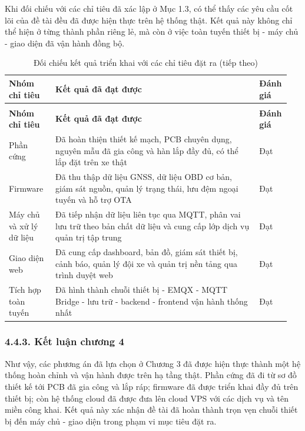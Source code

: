 \documentclass[a4paper]{extarticle}
\newcommand{\thesissettableid}[2]{%
  \renewcommand{\thetable}{#1}%
  \renewcommand{\theHtable}{#2}%
}
\begin{document}
Khi đối chiếu với các chỉ tiêu đã xác lập ở Mục 1.3, có thể thấy các yêu cầu cốt
lõi của đề tài đều đã được hiện thực trên hệ thống thật. Kết quả này không chỉ thể
hiện ở từng thành phần riêng lẻ, mà còn ở việc toàn tuyến thiết bị - máy chủ -
giao diện đã vận hành đồng bộ.

{\thesissettableid{4.15}{condensed-bang-4-15-doi-chieu-ket-qua-trien-khai-voi-cac-chi-tieu-dat-ra}
\def\LTcaptype{table}
\begin{longtable}{|L{0.160\linewidth}|L{0.700\linewidth}|L{0.090\linewidth}|}
\caption{Đối chiếu kết quả triển khai với các chỉ tiêu đặt ra}\label{tab:condensed-bang-4-15-doi-chieu-ket-qua-trien-khai-voi-cac-chi-tieu-dat-ra}\\
\hline
\textbf{Nhóm chỉ tiêu} & \textbf{Kết quả đã đạt được} & \textbf{Đánh giá} \\
\hline
\endfirsthead
\caption[]{Đối chiếu kết quả triển khai với các chỉ tiêu đặt ra (tiếp theo)}\\
\hline
\textbf{Nhóm chỉ tiêu} & \textbf{Kết quả đã đạt được} & \textbf{Đánh giá} \\
\hline
\endhead
\endfoot
\endlastfoot
Phần cứng & Đã hoàn thiện thiết kế mạch, PCB chuyên dụng, nguyên mẫu đã gia công và hàn lắp đầy đủ, có thể lắp đặt trên xe thật & Đạt \\\hline
Firmware & Đã thu thập dữ liệu GNSS, dữ liệu OBD cơ bản, giám sát nguồn, quản lý trạng thái, lưu đệm ngoại tuyến và hỗ trợ OTA & Đạt \\\hline
Máy chủ và xử lý dữ liệu & Đã tiếp nhận dữ liệu liên tục qua MQTT, phân vai lưu trữ theo bản chất dữ liệu và cung cấp lớp dịch vụ quản trị tập trung & Đạt \\\hline
Giao diện web & Đã cung cấp dashboard, bản đồ, giám sát thiết bị, cảnh báo, quản lý đội xe và quản trị nền tảng qua trình duyệt web & Đạt \\\hline
Tích hợp toàn tuyến & Đã hình thành chuỗi thiết bị - EMQX - MQTT Bridge - lưu trữ - backend - frontend vận hành thống nhất & Đạt \\\hline
\end{longtable}
}

\subsubsection{4.4.3. Kết luận chương 4}\label{kux1ebft-luux1eadn-chux1b0ux1a1ng-4}

Như vậy, các phương án đã lựa chọn ở Chương 3 đã được hiện thực thành một hệ
thống hoàn chỉnh và vận hành được trên hạ tầng thật. Phần cứng đã đi từ sơ đồ
thiết kế tới PCB đã gia công và lắp ráp; firmware đã được triển khai đầy đủ trên
thiết bị; còn hệ thống cloud đã được đưa lên cloud VPS với các dịch vụ và tên
miền công khai. Kết quả này xác nhận đề tài đã hoàn thành trọn vẹn chuỗi thiết bị đến máy chủ - giao diện trong phạm vi mục tiêu đặt ra.
\end{document}
